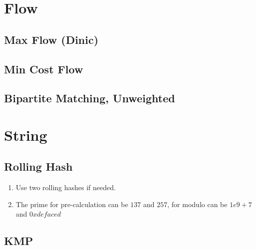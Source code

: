 \documentclass[10pt,oneside]{article}
\begin{document}
\begin{landscape}
\begin{multicols}{2}

\section{Flow}

\subsection{Max Flow (Dinic)}

\subsection{Min Cost Flow}

\subsection{Bipartite Matching, Unweighted}


\section{String}

\subsection{Rolling Hash}

{\normalsize 
\begin{enumerate}
	\item Use two rolling hashes if needed.  
	\item The prime for pre-calculation can be $137$ and $257$, for modulo can be $1e9 + 7$ and $0xdefaced$ 
\end{enumerate}
}


\subsection{KMP}


\end{multicols}
\end{landscape}
\end{document}
